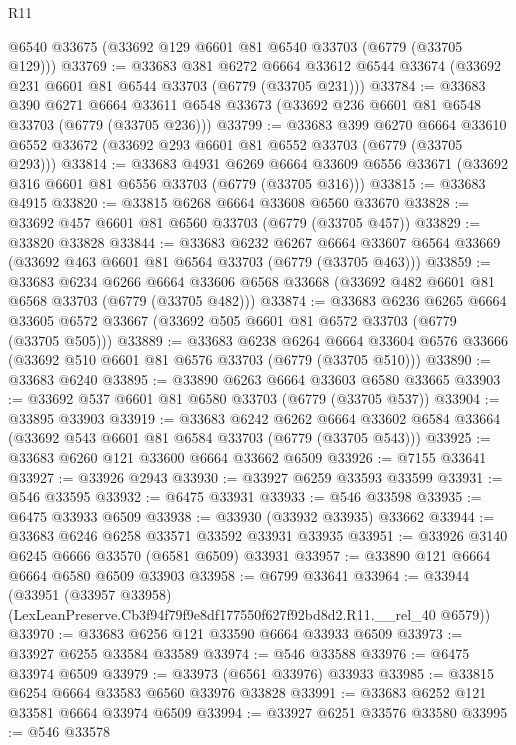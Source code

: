 \begin{lexlean}{R11}
\begin{coremodule}
    @6540
    @33675
    (@33692 @129 @6601 @81 @6540 @33703 (@6779 (@33705 @129)))
@33769 := @33683
    @381
    @6272
    @6664
    @33612
    @6544
    @33674
    (@33692 @231 @6601 @81 @6544 @33703 (@6779 (@33705 @231)))
@33784 := @33683
    @390
    @6271
    @6664
    @33611
    @6548
    @33673
    (@33692 @236 @6601 @81 @6548 @33703 (@6779 (@33705 @236)))
@33799 := @33683
    @399
    @6270
    @6664
    @33610
    @6552
    @33672
    (@33692 @293 @6601 @81 @6552 @33703 (@6779 (@33705 @293)))
@33814 := @33683
    @4931
    @6269
    @6664
    @33609
    @6556
    @33671
    (@33692 @316 @6601 @81 @6556 @33703 (@6779 (@33705 @316)))
@33815 := @33683 @4915
@33820 := @33815 @6268 @6664 @33608 @6560 @33670
@33828 := @33692 @457 @6601 @81 @6560 @33703 (@6779 (@33705 @457))
@33829 := @33820 @33828
@33844 := @33683
    @6232
    @6267
    @6664
    @33607
    @6564
    @33669
    (@33692 @463 @6601 @81 @6564 @33703 (@6779 (@33705 @463)))
@33859 := @33683
    @6234
    @6266
    @6664
    @33606
    @6568
    @33668
    (@33692 @482 @6601 @81 @6568 @33703 (@6779 (@33705 @482)))
@33874 := @33683
    @6236
    @6265
    @6664
    @33605
    @6572
    @33667
    (@33692 @505 @6601 @81 @6572 @33703 (@6779 (@33705 @505)))
@33889 := @33683
    @6238
    @6264
    @6664
    @33604
    @6576
    @33666
    (@33692 @510 @6601 @81 @6576 @33703 (@6779 (@33705 @510)))
@33890 := @33683 @6240
@33895 := @33890 @6263 @6664 @33603 @6580 @33665
@33903 := @33692 @537 @6601 @81 @6580 @33703 (@6779 (@33705 @537))
@33904 := @33895 @33903
@33919 := @33683
    @6242
    @6262
    @6664
    @33602
    @6584
    @33664
    (@33692 @543 @6601 @81 @6584 @33703 (@6779 (@33705 @543)))
@33925 := @33683 @6260 @121 @33600 @6664 @33662 @6509
@33926 := @7155 @33641
@33927 := @33926 @2943
@33930 := @33927 @6259 @33593 @33599
@33931 := @546 @33595
@33932 := @6475 @33931
@33933 := @546 @33598
@33935 := @6475 @33933 @6509
@33938 := @33930 (@33932 @33935) @33662
@33944 := @33683 @6246 @6258 @33571 @33592 @33931 @33935
@33951 := @33926 @3140 @6245 @6666 @33570 (@6581 @6509) @33931
@33957 := @33890 @121 @6664 @6664 @6580 @6509 @33903
@33958 := @6799 @33641
@33964 := @33944
    (@33951 (@33957 @33958) (LexLeanPreserve.Cb3f94f79f9e8df177550f627f92bd8d2.R11.__rel_40 @6579))
@33970 := @33683 @6256 @121 @33590 @6664 @33933 @6509
@33973 := @33927 @6255 @33584 @33589
@33974 := @546 @33588
@33976 := @6475 @33974 @6509
@33979 := @33973 (@6561 @33976) @33933
@33985 := @33815 @6254 @6664 @33583 @6560 @33976 @33828
@33991 := @33683 @6252 @121 @33581 @6664 @33974 @6509
@33994 := @33927 @6251 @33576 @33580
@33995 := @546 @33578

\end{coremodule}
\end{lexlean}
